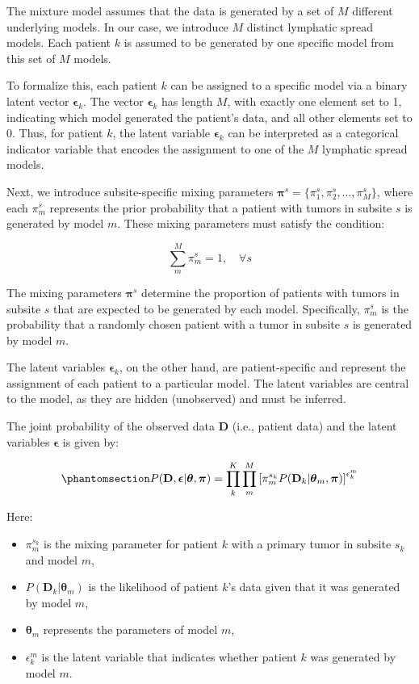 \documentclass[
  sn-mathphys-num,
]{sn-jnl}
\providecommand{\tightlist}{%
  \setlength{\itemsep}{0pt}\setlength{\parskip}{0pt}}\usepackage{longtable,booktabs,array}
\begin{document}
The mixture model assumes that the data is generated by a set of \(M\)
different underlying models. In our case, we introduce \(M\) distinct
lymphatic spread models. Each patient \(k\) is assumed to be generated
by one specific model from this set of \(M\) models.

To formalize this, each patient \(k\) can be assigned to a specific
model via a binary latent vector \(\boldsymbol{\epsilon}_k\). The vector
\(\boldsymbol{\epsilon}_k\) has length \(M\), with exactly one element
set to 1, indicating which model generated the patient's data, and all
other elements set to 0. Thus, for patient \(k\), the latent variable
\(\boldsymbol{\epsilon}_k\) can be interpreted as a categorical
indicator variable that encodes the assignment to one of the \(M\)
lymphatic spread models.

Next, we introduce subsite-specific mixing parameters
\(\boldsymbol{\pi}^s = \{\pi_1^s, \pi_2^s, \dots, \pi_M^s\}\), where
each \(\pi_m^s\) represents the prior probability that a patient with
tumors in subsite \(s\) is generated by model \(m\). These mixing
parameters must satisfy the condition:

\[
\sum_{m}^M \pi_m^s = 1, \quad \forall s
\]

The mixing parameters \(\boldsymbol{\pi}^s\) determine the proportion of
patients with tumors in subsite \(s\) that are expected to be generated
by each model. Specifically, \(\pi_m^s\) is the probability that a
randomly chosen patient with a tumor in subsite \(s\) is generated by
model \(m\).

The latent variables \(\boldsymbol{\epsilon}_{k}\), on the other hand,
are patient-specific and represent the assignment of each patient to a
particular model. The latent variables are central to the model, as they
are hidden (unobserved) and must be inferred.

The joint probability of the observed data \(\mathbf{D}\) (i.e., patient
data) and the latent variables \(\boldsymbol{\epsilon}\) is given by:

\begin{equation}\phantomsection\label{eq-complete-likelihood}{
P(\mathbf{D}, \boldsymbol{\epsilon} | \boldsymbol{\theta}, \boldsymbol{\pi}) = \prod_{k}^{K} \prod_{m}^{M} \left[ \pi_m^{s_k} P(\mathbf{D}_k | \boldsymbol{\theta}_m, \boldsymbol{\pi}) \right]^{\epsilon_{k}^m}
}\end{equation}

Here:

\begin{itemize}
\tightlist
\item
  \(\pi_m^{s_k}\) is the mixing parameter for patient \(k\) with a
  primary tumor in subsite \(s_k\) and model \(m\),
\item
  \(P(\mathbf{D}_k | \boldsymbol{\theta}_m)\) is the likelihood of
  patient \(k\)'s data given that it was generated by model \(m\),
\item
  \(\boldsymbol{\theta}_m\) represents the parameters of model \(m\),
\item
  \(\epsilon_{k}^m\) is the latent variable that indicates whether
  patient \(k\) was generated by model \(m\).
\end{itemize}
\end{document}
